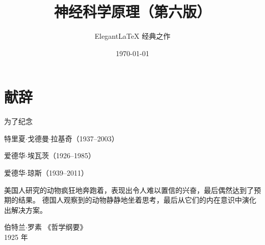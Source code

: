 \documentclass[cn,10pt,citestyle=gb7714-2015, bibstyle=gb7714-2015]{elegantbook}
\title{神经科学原理（第六版）}
\subtitle{Elegant\LaTeX{} 经典之作}
\institute{\href{https://github.com/OpenHUTB/neuro}{开源湖工商}}
\date{\today}
\numberwithin{figure}{section}
\begin{document}
\maketitle
\frontmatter

\chapter*{献辞}



\begin{center}
为了纪念

特里夏$\cdot$戈德曼$\cdot$拉基奇（1937–2003）

爱德华$\cdot$埃瓦茨（1926–1985）

爱德华$\cdot$琼斯（1939–2011）
\end{center}


\vskip 1.5cm

美国人研究的动物疯狂地奔跑着，表现出令人难以置信的兴奋，最后偶然达到了预期的结果。
德国人观察到的动物静静地坐着思考，最后从它们的内在意识中演化出解决方案。


\vskip 0.5cm


\vskip 1.5cm

\begin{flushright}
伯特兰$\cdot$罗素  《哲学纲要》\\
1925 年
\end{flushright}

\tableofcontents

\mainmatter













































\end{document}
